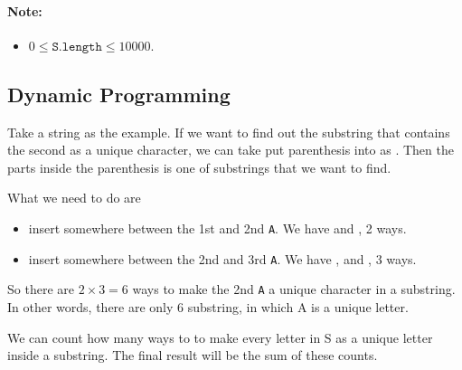  

\paragraph{Note:} 

\begin{itemize}
\item $0 \leq \texttt{S.length} \leq 10000$.
\end{itemize}

\subsection{Dynamic Programming}
Take a string  as the example. If we want to find out the substring that contains the second  as a unique character, we can take put parenthesis into as . Then the parts inside the parenthesis is one of substrings that we want to find.

What we need to do are
\begin{itemize}
\item insert  somewhere between the 1st and 2nd \texttt{A}. We have  and , 2 ways.
\item insert  somewhere between the 2nd and 3rd \texttt{A}. We have ,  and , 3 ways.
\end{itemize}

So there are $2 \times 3 = 6$ ways to make the 2nd \texttt{A} a unique character in a substring. In other words, there are only 6 substring, in which A is a unique letter.

We can count how many ways to to make every letter in S as a unique letter inside a substring. The final result will be the sum of these counts.


\setcounter{lstlisting}{0}


